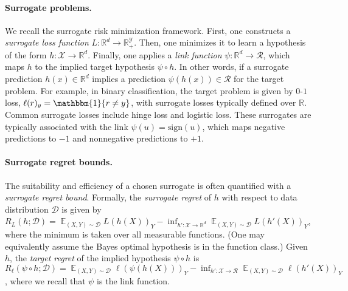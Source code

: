 \documentclass{article}
\theoremstyle{definition}\newtheorem{definition}{Definition}
\theoremstyle{definition}\newtheorem{assumption}{Assumption}
\newcommand{\reals}{\mathbb{R}}
\newcommand{\D}{\mathcal{D}}
\DeclareMathOperator{\E}{\mathbb{E}}  %
\newcommand{\R}{\mathcal{R}}
\newcommand{\X}{\mathcal{X}}
\newcommand{\Y}{\mathcal{Y}}
\newcommand{\ones}{\mathbbm{1}}
\begin{document}
\paragraph{Surrogate problems.}
We recall the surrogate risk minimization framework.
First, one constructs a \emph{surrogate loss function} $L:\reals^d\to\reals^\Y_+$.
Then, one minimizes it to learn a hypothesis of the form $h: \X \to \reals^d$.
Finally, one applies a \emph{link function} $\psi: \reals^d \to \R$, which maps $h$ to the implied target hypothesis $\psi \circ h$.
In other words, if a surrogate prediction $h(x) \in \reals^d$ implies a prediction $\psi(h(x)) \in \R$ for the target problem.
For example, in binary classification, the target problem is given by $0$-$1$ loss, $\ell(r)_y = \ones\{r\neq y\}$, with surrogate losses typically defined over $\reals$.
Common surrogate losses include hinge loss and logistic loss.
These surrogates are typically associated with the link $\psi(u) = \mathrm{sign}(u)$, which maps negative predictions to $-1$ and nonnegative predictions to $+1$.

\paragraph{Surrogate regret bounds.}
The suitability and efficiency of a chosen surrogate is often quantified with a \emph{surrogate regret bound}.
Formally, the \emph{surrogate regret} of $h$ with respect to data distribution $\D$ is given by $R_L(h;\D) = \E_{(X,Y)\sim\D} L(h(X))_Y - \inf_{h':\X\to\reals^d} \E_{(X,Y)\sim\D} L(h'(X))_Y$, where the minimum is taken over all measurable functions.
(One may equivalently assume the Bayes optimal hypothesis is in the function class.)
Given $h$, the \emph{target regret} of the implied hypothesis $\psi \circ h$ is $R_\ell(\psi\circ h;\D) = \E_{(X,Y)\sim\D} \ell(\psi(h(X)))_Y - \inf_{h':\X\to\R} \E_{(X,Y)\sim\D} \ell(h'(X))_Y$, where we recall that $\psi$ is the link function.

\end{document}
